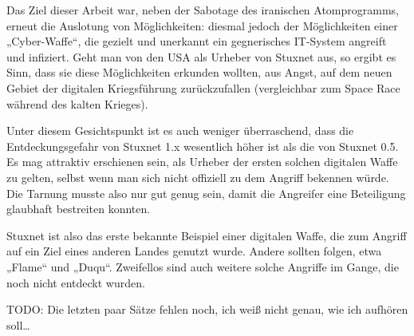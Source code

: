 \documentclass[a4paper]{article}
\begin{document}
Das Ziel dieser Arbeit war, neben der Sabotage des iranischen Atomprogramms, erneut die Auslotung von Möglichkeiten:
diesmal jedoch der Möglichkeiten einer „Cyber-Waffe“, die gezielt und unerkannt ein gegnerisches IT-System angreift und infiziert.
Geht man von den USA als Urheber von Stuxnet aus, so ergibt es Sinn, dass sie diese Möglichkeiten erkunden wollten,
aus Angst, auf dem neuen Gebiet der digitalen Kriegsführung zurückzufallen (vergleichbar zum Space Race während des kalten Krieges).

Unter diesem Gesichtspunkt ist es auch weniger überraschend, dass die Entdeckungsgefahr von Stuxnet 1.x wesentlich höher ist als die von Stuxnet 0.5.
Es mag attraktiv erschienen sein, als Urheber der ersten solchen digitalen Waffe zu gelten,
selbst wenn man sich nicht offiziell zu dem Angriff bekennen würde.
Die Tarnung musste also nur gut genug sein, damit die Angreifer eine Beteiligung glaubhaft bestreiten konnten.

Stuxnet ist also das erste bekannte Beispiel einer digitalen Waffe, die zum Angriff auf ein Ziel eines anderen Landes genutzt wurde.
Andere sollten folgen, etwa „Flame“ und „Duqu“.
Zweifellos sind auch weitere solche Angriffe im Gange, die noch nicht entdeckt wurden.

TODO: Die letzten paar Sätze fehlen noch, ich weiß nicht genau, wie ich aufhören soll…



\end{document}
